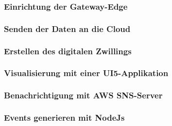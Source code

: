 \subsubsection{Einrichtung der Gateway-Edge}

\subsubsection{Senden der Daten an die Cloud}

\subsubsection{Erstellen des digitalen Zwillings}

\subsubsection{Visualisierung mit einer UI5-Applikation}

\subsubsection{Benachrichtigung mit AWS SNS-Server}

\subsubsection{Events generieren mit NodeJs}

\newpage
